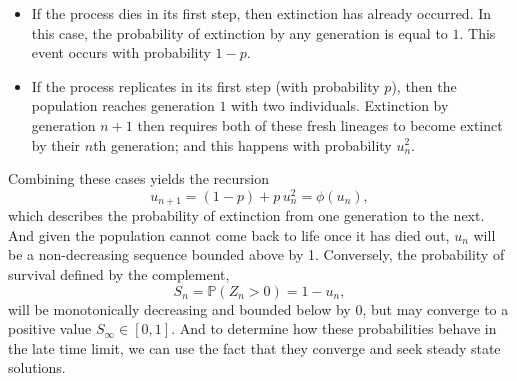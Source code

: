 \begin{itemize}
    \item If the process dies in its first step, then extinction has already
    occurred. In this case, the probability of extinction by any generation is
    equal to $1$. This event occurs with probability $1-p$.
    \item If the process replicates in its first step (with probability $p$), then the population
    reaches generation $1$ with two individuals. Extinction by generation $n+1$
    then requires both of these fresh lineages to become extinct by their $n$th generation; and this happens with probability $u_n^2$.
\end{itemize}

\noindent
Combining these cases yields the recursion
\begin{equation}
u_{n+1} = (1-p) + p\, u_n^2 = \phi(u_n),
\label{eq:unrec}
\end{equation}
which describes the probability of extinction from one generation to the next. And given the population cannot come
back to life once it has died out, $u_n$ will be a non-decreasing sequence bounded above by 1. Conversely, the probability of survival
defined by the complement, $$ S_n = \mathbb{P}(Z_n > 0)  = 1-u_n,$$ will be monotonically decreasing and bounded below by 0, but may converge to a positive value $S_\infty \in [0,1]$.
And to determine how these probabilities behave in the late time limit, we can use the fact that they converge and seek steady state solutions.



